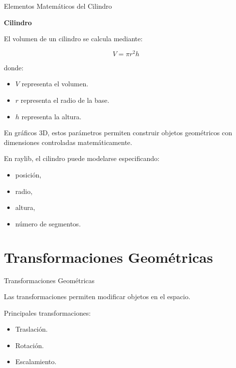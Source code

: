 \documentclass{beamer}
\begin{document}
\begin{frame}{Elementos Matemáticos del Cilindro}

\textbf{Cilindro}

\vspace{0.2cm}

El volumen de un cilindro se calcula mediante:

$$
V=\pi r^2 h
$$

donde:

\begin{itemize}
    \item $V$ representa el volumen.
    \item $r$ representa el radio de la base.
    \item $h$ representa la altura.
\end{itemize}

\vspace{0.1cm}

En gráficos 3D, estos parámetros permiten construir objetos geométricos con dimensiones controladas matemáticamente.

\vspace{0.1cm}

En raylib, el cilindro puede modelarse especificando:

\begin{itemize}
    \item posición,
    \item radio,
    \item altura,
    \item número de segmentos.
\end{itemize}

\end{frame}

\section{Transformaciones Geométricas}

\begin{frame}{Transformaciones Geométricas}

Las transformaciones permiten modificar objetos en el espacio.

\vspace{0.3cm}

Principales transformaciones:

\begin{itemize}
    \item Traslación.
    \item Rotación.
    \item Escalamiento.
\end{itemize}

\end{frame}
\end{document}
